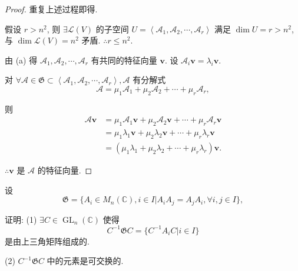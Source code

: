 \documentclass{ctexart}
\begin{document}
\begin{proof}
    重复上述过程即得.
    
    假设 $r>n^2$, 则 $\exists\mathcal{L}(V)$ 的子空间 $U=\left<\mathcal{A}_1,\mathcal{A}_2,\cdots,\mathcal{A}_r\right>$ 满足 $\dim U=r>n^2$, 与 $\dim\mathcal{L}(V)=n^2$ 矛盾. $\therefore r\leq n^2$.

    由 (a) 得 $\mathcal{A}_1,\mathcal{A}_2,\cdots,\mathcal{A}_r$ 有共同的特征向量 $\boldsymbol{v}$. 设 $\mathcal{A}_i\boldsymbol{v}=\lambda_i\boldsymbol{v}$.

    对 $\forall\mathcal{A}\in\mathfrak{G}\subset\left<\mathcal{A}_1,\mathcal{A}_2,\cdots,\mathcal{A}_r\right>,\mathcal{A}$ 有分解式
    \[\mathcal{A}=\mu_1\mathcal{A}_1+\mu_2\mathcal{A}_2+\cdots+\mu_r\mathcal{A}_r,\]

    则
    \begin{align*}
        \mathcal{A}\boldsymbol{v} & =\mu_1\mathcal{A}_1\boldsymbol{v}+\mu_2\mathcal{A}_2\boldsymbol{v}+\cdots+\mu_r\mathcal{A}_r\boldsymbol{v} \\
        & =\mu_1\lambda_1\boldsymbol{v}+\mu_2\lambda_2\boldsymbol{v}+\cdots+\mu_r\lambda_r\boldsymbol{v} \\
        & =(\mu_1\lambda_1+\mu_2\lambda_2+\cdots+\mu_r\lambda_r)\boldsymbol{v}.
    \end{align*}

    $\therefore\boldsymbol{v}$ 是 $\mathcal{A}$ 的特征向量.
\end{proof}
\begin{exercise}[3.10]
    设
    \[\mathfrak{G}=\{A_i\in M_n(\mathbb{C}),i\in I|A_iA_j=A_jA_i,\forall i,j\in I\},\]

    证明: (1) $\exists C\in\operatorname{GL}_n(\mathbb{C})$ 使得
    \[C^{-1}\mathfrak{G}C=\{C^{-1}A_iC|i\in I\}\]
    是由上三角矩阵组成的.

    (2) $C^{-1}\mathfrak{G}C$ 中的元素是可交换的.
\end{exercise}
\end{document}
